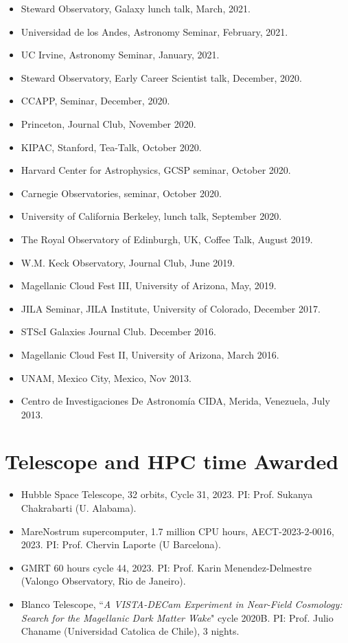 \documentclass[14pt]{article}
\begin{document}
\begin{itemize}
    June 2021. \dag
\item Steward Observatory, Galaxy lunch talk, March, 2021.
\item Universidad de los Andes, Astronomy Seminar, February, 2021. 
\item UC Irvine, Astronomy Seminar, January, 2021. \dag
\item Steward Observatory, Early Career Scientist talk, December, 2020. \dag
\item CCAPP, Seminar, December, 2020. \dag
\item Princeton, Journal Club, November 2020. \dag
\item KIPAC, Stanford, Tea-Talk, October 2020.
\item Harvard Center for Astrophysics, GCSP seminar, October 2020.
\item Carnegie Observatories, seminar, October 2020. \dag
\item University of California Berkeley, lunch talk, September 2020. 
\item The Royal Observatory of Edinburgh, UK, Coffee Talk, August 2019. \dag
\item W.M. Keck Observatory, Journal Club, June 2019.
\item Magellanic Cloud Fest III, University of Arizona, May, 2019.
\item JILA Seminar, JILA Institute, University of Colorado, December 2017.
\item STScI Galaxies Journal Club. December 2016.
\item Magellanic Cloud Fest II, University of Arizona, March 2016.
\item UNAM, Mexico City, Mexico, Nov 2013. 
\item Centro de Investigaciones De Astronom\'ia CIDA, Merida, Venezuela, July 2013.
\end{itemize}

\section*{Telescope and HPC time Awarded}
\begin{itemize}
  \setlength\itemsep{0.0em}
  \renewcommand\labelitemi{$\cdot$}
\item Hubble Space Telescope, 32 orbits, Cycle 31, 2023. PI: Prof. Sukanya Chakrabarti (U. Alabama). 
\item MareNostrum supercomputer, 1.7 million CPU hours, AECT-2023-2-0016, 2023.
  PI: Prof. Chervin Laporte (U Barcelona). 
\item GMRT 60 hours cycle 44, 2023. PI: Prof. Karin Menendez-Delmestre (Valongo Observatory, Rio de Janeiro).
\item Blanco Telescope, ``\textit{A VISTA-DECam Experiment in Near-Field
  Cosmology: Search for the Magellanic Dark Matter Wake}" cycle 2020B. PI: Prof. Julio
  Chaname (Universidad Catolica de Chile), 3 nights.
\end{itemize}
\end{document}

